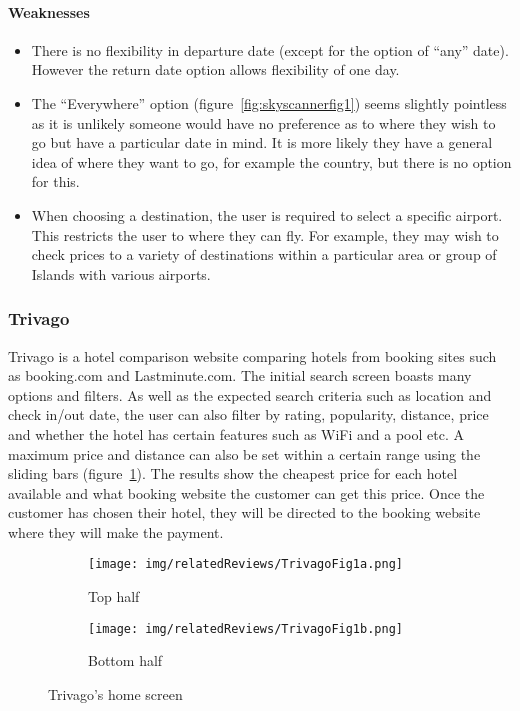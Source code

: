 \paragraph{Weaknesses}
\begin{itemize}
	\item There is no flexibility in departure date (except for the option of
		``any'' date). However the return date option allows flexibility of one
		day.
	\item The ``Everywhere'' option (figure~\ref{fig:skyscannerfig1}) seems
		slightly pointless as it is unlikely someone would have no preference
		as to where they wish to go but have a particular date in mind. It is
		more likely they have a general idea of where they want to go, for
		example the country, but there is no option for this.
	\item When choosing a destination, the user is required to select a
		specific airport. This restricts the user to where they can fly. For
		example, they may wish to check prices to a variety of destinations
		within a particular area or group of Islands with various airports.
\end{itemize}

\subsubsection{Trivago}
\label{ssub:trivago}

Trivago is a hotel comparison website comparing hotels from booking sites such
as booking.com and Lastminute.com. The initial search screen boasts many
options and filters. As well as the expected search criteria such as location
and check in/out date, the user can also filter by rating, popularity,
distance, price and whether the hotel has certain features such as WiFi and a
pool etc. A maximum price and distance can also be set within a certain range
using the sliding bars (figure~\ref{fig:trivago1}). The results show the
cheapest price for each hotel available and what booking website the customer
can get this price. Once the customer has chosen their hotel, they will be
directed to the booking website where they will make the payment.
\begin{figure}[ht]
	\centering
	\begin{subfigure}[b]{0.2\textwidth}
		\texttt{[image: img/relatedReviews/TrivagoFig1a.png]}
		\caption{Top half}
	\end{subfigure}
	\qquad
	\begin{subfigure}[b]{0.2\textwidth}
		\texttt{[image: img/relatedReviews/TrivagoFig1b.png]}
		\caption{Bottom half}
	\end{subfigure}
	\caption{Trivago's home screen}\label{fig:trivago1}
\end{figure}


